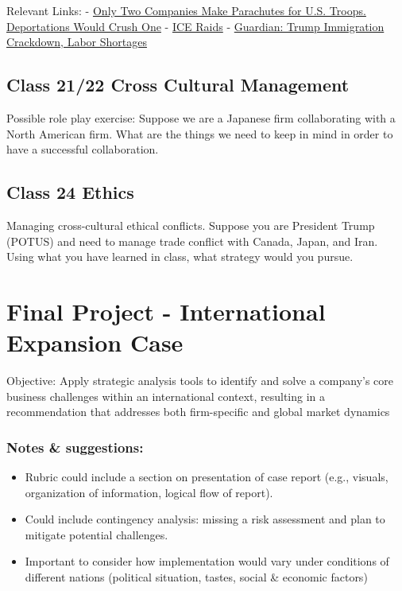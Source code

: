 \documentclass[
  11pt,
]{article}
\providecommand{\tightlist}{%
  \setlength{\itemsep}{0pt}\setlength{\parskip}{0pt}}
\begin{document}
Relevant Links: -
\href{https://archive.ph/Sv9RA\#selection-2617.85-2617.256}{Only Two
Companies Make Parachutes for U.S. Troops. Deportations Would Crush One}
- \href{https://archive.ph/pp4xl}{ICE Raids} -
\href{https://www.theguardian.com/us-news/2025/jul/29/trump-immigration-crackdown-labor-shortages-slowdowns}{Guardian:
Trump Immigration Crackdown, Labor Shortages}

\subsection{Class 21/22 Cross Cultural
Management}\label{class-2122-cross-cultural-management}

Possible role play exercise: Suppose we are a Japanese firm
collaborating with a North American firm. What are the things we need to
keep in mind in order to have a successful collaboration.

\subsection{Class 24 Ethics}\label{class-24-ethics}

Managing cross-cultural ethical conflicts. Suppose you are President
Trump (POTUS) and need to manage trade conflict with Canada, Japan, and
Iran. Using what you have learned in class, what strategy would you
pursue.

\section{Final Project - International Expansion
Case}\label{final-project---international-expansion-case}

Objective: Apply strategic analysis tools to identify and solve a
company's core business challenges within an international context,
resulting in a recommendation that addresses both firm-specific and
global market dynamics

\subsubsection{Notes \& suggestions:}\label{notes-suggestions}

\begin{itemize}
\tightlist
\item
  Rubric could include a section on presentation of case report (e.g.,
  visuals, organization of information, logical flow of report).
\item
  Could include contingency analysis: missing a risk assessment and plan
  to mitigate potential challenges.
\item
  Important to consider how implementation would vary under conditions
  of different nations (political situation, tastes, social \& economic
  factors)
\end{itemize}


\printbibliography
\end{document}
